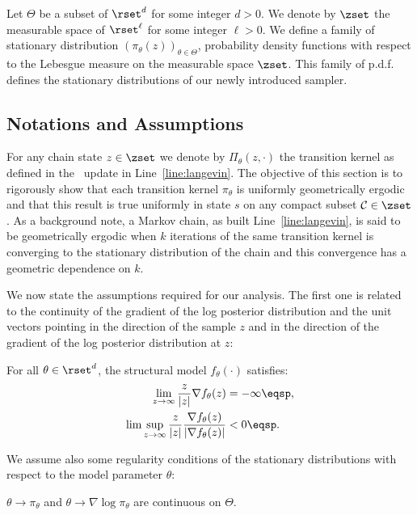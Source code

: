 \documentclass[10pt,twocolumn,letterpaper]{article}
\begin{document}
Let $\Theta$ be a subset of $\rset^d$ for some integer $d >0$.
We denote by $\zset$ the measurable space of $\rset^\ell$ for some integer $\ell >0$.
We define a family of stationary distribution $\left(\pi_\theta(z) \right)_{\theta \in \Theta}$, probability density functions with respect to the Lebesgue measure on the measurable space $\zset$. This family of p.d.f. defines the stationary distributions of our newly introduced sampler.

\subsection{Notations and Assumptions}
For any chain state $z \in \zset$ we denote by $\Pi_\theta(z,\cdot)$ the transition kernel as defined in the \algo\ update in Line~\ref{line:langevin}.
The objective of this section is to rigorously show that each transition kernel $\pi_\theta$ is uniformly geometrically ergodic and that this result is true uniformly in state $s$ on any compact subset $\mathcal{C} \in \zset$.
As a background note, a Markov chain, as built Line~\ref{line:langevin}, is said to be geometrically ergodic when $k$ iterations of the same transition kernel is converging to the stationary distribution of the chain and this convergence has a geometric dependence on $k$.

We now state the assumptions required for our analysis.
The first one is related to the continuity of the gradient of the log posterior distribution and the unit vectors pointing in the direction of the sample $z$ and in the direction of the gradient of the log posterior distribution at $z$:
\begin{assumption}\label{ass:bounded}
For all $\theta \in \rset^d$, the structural model $f_\theta(\cdot)$ satisfies:
\begin{equation}\notag
\begin{split}
\lim \limits_{z \to \infty} \frac{z}{|z|} \nabla f_{\theta}(z) & = - \infty \eqsp,\\
 \lim \sup \limits_{z \to \infty} \frac{z}{|z|} \frac{\nabla f_{\theta}(z) }{|\nabla f_{\theta}(z) |} &< 0 \eqsp.
\end{split}
\end{equation}
\end{assumption}

We assume also some regularity conditions of the stationary distributions with respect to the model parameter $\theta$:
\begin{assumption}\label{ass:contlogpi}
$\theta \to \pi_\theta$ and $\theta \to \nabla \log \pi_\theta$ are continuous on $\Theta$.
\end{assumption}
\end{document}
